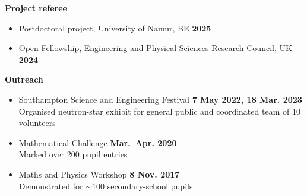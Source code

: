 \documentclass[%
    margin,
    line,
    11pt,
]{res}
\begin{document}
\begin{resume}
\textbf{Project referee}
\vspace*{0.05in}
\begin{itemize}
    \item[] Postdoctoral project, University of Namur, BE \hfill \textbf{2025}
    \item[] Open Fellowship,
    Engineering and Physical Sciences Research Council, UK \hfill \textbf{2024}
\end{itemize}

\textbf{Outreach}
\vspace*{0.05in}
\begin{itemize}
    \item[] Southampton Science and Engineering Festival
    \hfill \textbf{7 May 2022, 18 Mar. 2023} \\
    \hspace*{1em} Organised neutron-star exhibit for general public and
    coordinated team of 10 volunteers
    \item[] Mathematical Challenge \hfill \textbf{Mar.--Apr. 2020} \\
    \hspace*{1em} Marked over 200 pupil entries
    \item[] Maths and Physics Workshop \hfill \textbf{8 Nov. 2017} \\
    \hspace*{1em} Demonstrated for $\sim 100$ secondary-school pupils
\end{itemize}


\end{resume}
\end{document}
